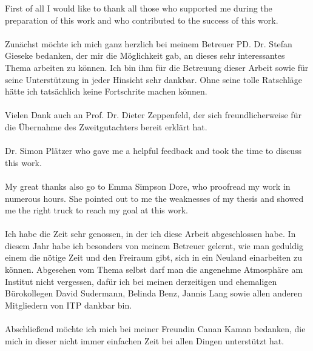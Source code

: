 
First of all I would like to thank all those who supported me during the preparation of this work and who contributed to the success of this work.\\
\\
Zunächst möchte ich mich ganz herzlich bei meinem Betreuer PD. Dr. Stefan Gieseke bedanken, der mir die Möglichkeit gab, an dieses sehr interessantes Thema arbeiten zu können. Ich bin ihm für die Betreuung dieser Arbeit sowie für seine Unterstützung in jeder Hinsicht sehr dankbar. Ohne seine tolle Ratschläge hätte ich tatsächlich keine Fortschrite machen können.\\
\\
Vielen Dank auch an Prof. Dr. Dieter Zeppenfeld, der sich freundlicherweise für die Übernahme des Zweitgutachters bereit erklärt hat.\\
\\
Dr. Simon Plätzer who gave me a helpful feedback and took the time to discuss this work.\\
\\
My great thanks also go to Emma Simpson Dore, who proofread my work in numerous hours. She pointed out to me the weaknesses of my thesis and showed me the right truck to reach my goal at this work.\\
\\
Ich habe die Zeit sehr genossen, in der ich diese Arbeit abgeschlossen habe. In diesem Jahr habe ich besonders von meinem Betreuer gelernt, wie man geduldig einem die nötige Zeit und den Freiraum gibt, sich in ein Neuland einarbeiten zu können.  Abgesehen vom Thema selbst darf man die angenehme Atmosphäre am Institut nicht vergessen, dafür ich bei meinen derzeitigen und ehemaligen Bürokollegen David Sudermann, Belinda Benz, Jannis Lang sowie allen anderen Mitgliedern von ITP dankbar bin.\\
\\ 
Abschließend möchte ich mich bei meiner Freundin Canan Kaman bedanken, die mich in dieser nicht immer einfachen Zeit bei allen Dingen unterstützt hat.\\


 
         

